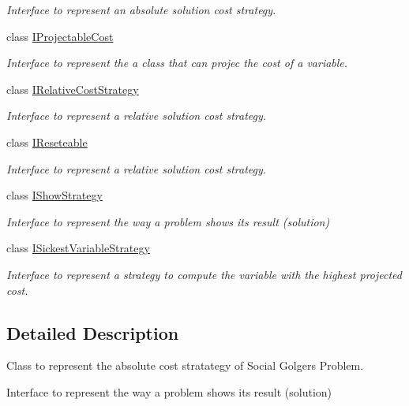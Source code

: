 \begin{DoxyCompactItemize}
\begin{DoxyCompactList}\small\item\em Interface to represent an absolute solution cost strategy. \end{DoxyCompactList}\item 
class \hyperlink{interfacePOSL_1_1Benchmarks_1_1IProjectableCost}{I\+Projectable\+Cost}
\begin{DoxyCompactList}\small\item\em Interface to represent the a class that can projec the cost of a variable. \end{DoxyCompactList}\item 
class \hyperlink{interfacePOSL_1_1Benchmarks_1_1IRelativeCostStrategy}{I\+Relative\+Cost\+Strategy}
\begin{DoxyCompactList}\small\item\em Interface to represent a relative solution cost strategy. \end{DoxyCompactList}\item 
class \hyperlink{interfacePOSL_1_1Benchmarks_1_1IReseteable}{I\+Reseteable}
\begin{DoxyCompactList}\small\item\em Interface to represent a relative solution cost strategy. \end{DoxyCompactList}\item 
class \hyperlink{interfacePOSL_1_1Benchmarks_1_1IShowStrategy}{I\+Show\+Strategy}
\begin{DoxyCompactList}\small\item\em Interface to represent the way a problem shows its result (solution) \end{DoxyCompactList}\item 
class \hyperlink{interfacePOSL_1_1Benchmarks_1_1ISickestVariableStrategy}{I\+Sickest\+Variable\+Strategy}
\begin{DoxyCompactList}\small\item\em Interface to represent a strategy to compute the variable with the highest projected cost. \end{DoxyCompactList}\end{DoxyCompactItemize}


\subsection{Detailed Description}
Class to represent the absolute cost stratategy of Social Golgers Problem. 

Interface to represent the way a problem shows its result (solution)

